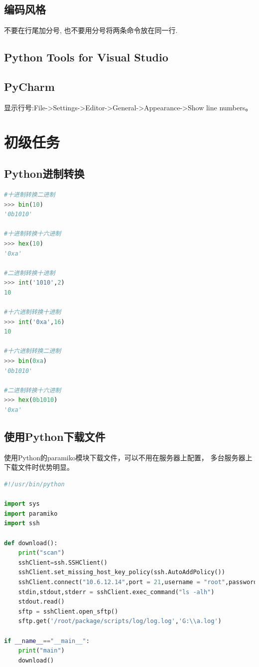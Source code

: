 \documentclass{book}
\begin{document}
\subsection{编码风格}

不要在行尾加分号, 也不要用分号将两条命令放在同一行.\subsection{Python Tools for Visual Studio}

\subsection{PyCharm}

显示行号:File->Settings->Editor->General->Appearance->Show line numbers。

\section{初级任务}

\subsection{Python进制转换}

\begin{lstlisting}[language=Python]
#十进制转换二进制 
>>> bin(10) 
'0b1010' 

#十进制转换十六进制 
>>> hex(10) 
'0xa' 

#二进制转换十进制 
>>> int('1010',2) 
10 

#十六进制转换十进制 
>>> int('0xa',16) 
10 

#十六进制转换二进制 
>>> bin(0xa) 
'0b1010' 

#二进制转换十六进制 
>>> hex(0b1010) 
'0xa' 
\end{lstlisting}

\subsection{使用Python下载文件}

使用Python的paramiko模块下载文件，可以不用在服务器上配置，
多台服务器上下载文件时优势明显。

\begin{lstlisting}[language=Python]
#!/usr/bin/python

import sys
import paramiko
import ssh

def download():
	print("scan")
	sshClient=ssh.SSHClient()
	sshClient.set_missing_host_key_policy(ssh.AutoAddPolicy())
	sshClient.connect("10.6.12.14",port = 21,username = "root",password = "123456")
	stdin,stdout,stderr = sshClient.exec_command("ls -alh")
	stdout.read()
	sftp = sshClient.open_sftp()
	sftp.get('/root/package/scripts/log/log.log','G:\\a.log')

if __name__=="__main__":
	print("main")
	download()
\end{lstlisting}
\end{document}
